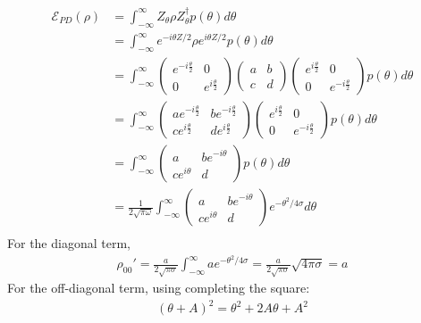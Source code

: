 \begin{align}
    \mathcal{E}_{PD}(\rho) &= \int_{-\infty}^{\infty} Z_\theta \rho Z_\theta^\dagger p(\theta) d\theta \\
    &= \int_{-\infty}^{\infty} e^{-i\theta Z/2} \rho e^{i\theta Z/2} p(\theta) d\theta \\
    &= \int_{-\infty}^{\infty} \begin{pmatrix}e^{-i\frac{\theta}{2}} & 0 \\ 0 & e^{i\frac{\theta}{2}}\end{pmatrix}   \begin{pmatrix} a & b \\ c & d \end{pmatrix} \begin{pmatrix}e^{i\frac{\theta}{2}} & 0 \\ 0 & e^{-i\frac{\theta}{2}}\end{pmatrix} p(\theta) d\theta \\
    &=  \int_{-\infty}^{\infty} \begin{pmatrix} ae^{-i\frac{\theta}{2}} & be^{-i\frac{\theta}{2}} \\ ce^{i\frac{\theta}{2}} & de^{i\frac{\theta}{2}} \end{pmatrix} \begin{pmatrix}e^{i\frac{\theta}{2}} & 0 \\ 0 & e^{-i\frac{\theta}{2}}\end{pmatrix} p(\theta) d\theta \\
    &= \int_{-\infty}^{\infty} \begin{pmatrix} a & b e^{-i \theta} \\ ce^{i \theta} & d \end{pmatrix}  p(\theta) d\theta \\
    &= \frac{1}{2\sqrt{\pi \omega}} \int_{-\infty}^{\infty} \begin{pmatrix} a & b e^{-i \theta} \\ ce^{i \theta} & d \end{pmatrix}  e^{-\theta^2/4\sigma} d\theta \\
\end{align}
For the diagonal term, 
\begin{align}
    \rho_{00}' = \frac{a }{2\sqrt{\pi \sigma}} \int_{-\infty}^{\infty} a e^{-\theta^2/4\sigma} = \frac{a}{2\sqrt{\pi \sigma}} \sqrt{4 \pi \sigma } = a 
\end{align}
For the off-diagonal term, using completing the square: 
\begin{align}
    (\theta + A)^2 = \theta ^2 + 2 A \theta + A^2
\end{align}
